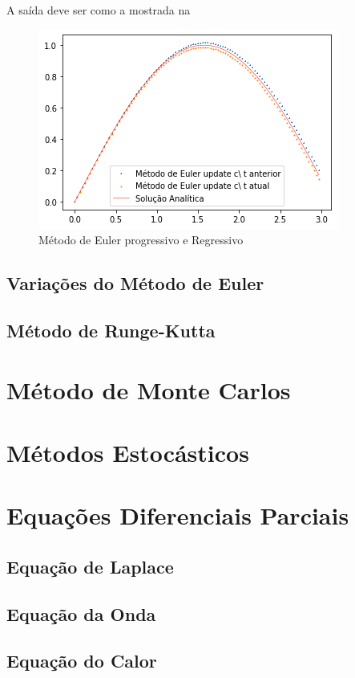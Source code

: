A saída deve ser como a mostrada na 

\begin{figure}
    \centering
    \includegraphics{Images/euler2.png}
    \caption{Método de Euler progressivo e Regressivo}
    \label{fig:euler2}
\end{figure}

\subsection{Variações do Método de Euler}
\subsection{Método de Runge-Kutta}
\section{Método de Monte Carlos}\label{sc:Monte_Carlo}
\section{Métodos Estocásticos}
\section{Equações Diferenciais Parciais}
\subsection{Equação de Laplace}
\subsection{Equação da Onda}
\subsection{Equação do Calor}
